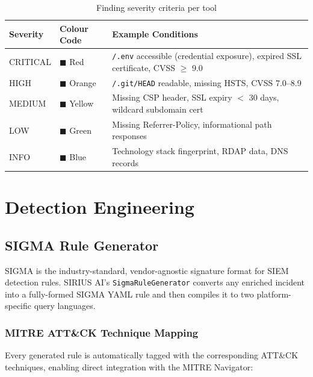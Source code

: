 \documentclass[12pt,a4paper]{article}
\begin{document}
\begin{table}[H]
\centering
\caption{Finding severity criteria per tool}
\begin{tabular}{llp{7cm}}
\toprule
\textbf{Severity} & \textbf{Colour Code} & \textbf{Example Conditions} \\
\midrule
CRITICAL & \textcolor{critical}{$\blacksquare$} Red    & \texttt{/.env} accessible (credential exposure), expired SSL certificate, CVSS $\geq$ 9.0 \\
HIGH     & \textcolor{high}{$\blacksquare$} Orange  & \texttt{/.git/HEAD} readable, missing HSTS, CVSS 7.0--8.9 \\
MEDIUM   & \textcolor{medium}{$\blacksquare$} Yellow & Missing CSP header, SSL expiry $<$ 30 days, wildcard subdomain cert \\
LOW      & \textcolor{low}{$\blacksquare$} Green   & Missing Referrer-Policy, informational path responses \\
INFO     & $\blacksquare$ Blue   & Technology stack fingerprint, RDAP data, DNS records \\
\bottomrule
\end{tabular}
\end{table}

\section{Detection Engineering}

\subsection{SIGMA Rule Generator}

SIGMA is the industry-standard, vendor-agnostic signature format for SIEM detection rules.
SIRIUS AI's \texttt{SigmaRuleGenerator} converts any enriched incident into a fully-formed
SIGMA YAML rule and then compiles it to two platform-specific query languages.

\subsubsection{MITRE ATT\&CK Technique Mapping}

Every generated rule is automatically tagged with the corresponding ATT\&CK techniques,
enabling direct integration with the MITRE Navigator:
\end{document}
